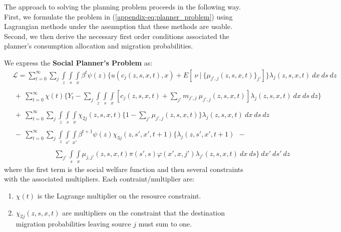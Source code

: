 \documentclass[12pt,pdftex]{article}
\begin{document}
\begin{onehalfspacing}
The approach to solving the planning problem proceeds in the following way. First, we formulate the problem in (\ref{appendix-eq:planner_problem}) using Lagrangian methods under the assumption that these methods are usable. Second, we then derive the necessary first order conditions associated the planner's consumption allocation and migration probabilities.

We express the \textbf{Social Planner's Problem} as:
{\small
\begin{align}
& \mathcal{L}  =   \sum_{t=0}^{\infty}\sum_{j} \int\limits_{z} \int\limits_{s} \int\limits_{x} \beta^{t} \psi(z) \bigg \{ u(c_{j}(z, s, x, t), x) + E[ \ \nu \ | \ \big\{\mu_{j',j}(z,s,x,t)\big\}_{j'}] \bigg \} \lambda_{j}(z, s, x, t) \ dx \ ds \ dz \label{appendix-eq:planner_L} \\
\nonumber \\
 & \ + \ \sum_{t=0}^{\infty} \chi(t) \bigg \{ Y_t - \sum_{j}\int\limits_{z} \int\limits_{s} \int\limits_{x} \left[ c_{j}(z, s, x, t)  +  \sum_{j'}  m_{j',j} \ \mu_{j',j}(z, s, x, t)\right] \lambda_{j}(z, s, x, t) \ dx \ ds \ dz \bigg \} \nonumber \\
\nonumber  \\
& \ + \ \sum_{t=0}^{\infty} \sum_{j} \int\limits_{z} \int\limits_{s} \int\limits_{x} \chi_{2j}(z, s, x, t) \bigg \{1 - \sum_{j'} \mu_{j',j}(z, s, x,t) \bigg \} \lambda_{j}(z, s, x, t) \ dx \ ds \ dz \nonumber \\
\nonumber \\
& \ - \ \sum_{t=0}^{\infty} \sum_{j} \int\limits_{z} \int\limits_{s'} \int\limits_{x'} \beta^{t+1} \psi(z) \chi_{3j}(z, s', x', t+1) \bigg \{\lambda_{j}(z, s', x', t+1) \ \ - \nonumber \\
\nonumber \\
& \ \ \ \ \ \ \ \ \ \ \ \ \ \ \ \ \ \ \ \ \ \ \ \ \ \ \
 \sum_{j'}  \int\limits_{s} \int\limits_{x} \mu_{j,j'}(z,s,x,t) \pi(s',s) \varphi(x',x, j') \lambda_{j'}(z,s, x, t) \ dx  \ ds  \bigg \} \ dx'  \ ds' \ dz \nonumber
\end{align}}where the first term is the social welfare function and then several constraints with the associated multipliers. Each contraint/multiplier are:
\begin{enumerate}
\item $\chi(t)$ is the Lagrange multiplier on the resource constraint.

\item $\chi_{2j}(z, s, x, t)$ are multipliers on the constraint that the destination migration probabilities leaving source $j$ must sum to one.


\end{enumerate}
\end{onehalfspacing}
\end{document}
